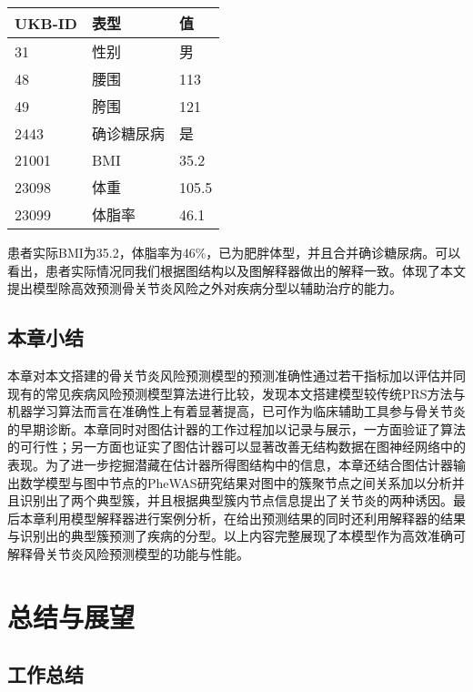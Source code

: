 \documentclass[
]{article}
\begin{document}
\begin{longtable}[]{@{}lll@{}}
\toprule()
UKB-ID & 表型 & 值 \\
\midrule()
\endhead
31 & 性别 & 男 \\
48 & 腰围 & 113 \\
49 & 胯围 & 121 \\
2443 & 确诊糖尿病 & 是 \\
21001 & BMI & 35.2 \\
23098 & 体重 & 105.5 \\
23099 & 体脂率 & 46.1 \\
\bottomrule()
\end{longtable}

患者实际BMI为35.2，体脂率为46\%，已为肥胖体型，并且合并确诊糖尿病。可以看出，患者实际情况同我们根据图结构以及图解释器做出的解释一致。体现了本文提出模型除高效预测骨关节炎风险之外对疾病分型以辅助治疗的能力。

\hypertarget{ux672cux7ae0ux5c0fux7ed3-3}{%
\subsection{本章小结}\label{ux672cux7ae0ux5c0fux7ed3-3}}

本章对本文搭建的骨关节炎风险预测模型的预测准确性通过若干指标加以评估并同现有的常见疾病风险预测模型算法进行比较，发现本文搭建模型较传统PRS方法与机器学习算法而言在准确性上有着显著提高，已可作为临床辅助工具参与骨关节炎的早期诊断。本章同时对图估计器的工作过程加以记录与展示，一方面验证了算法的可行性；另一方面也证实了图估计器可以显著改善无结构数据在图神经网络中的表现。为了进一步挖掘潜藏在估计器所得图结构中的信息，本章还结合图估计器输出数学模型与图中节点的PheWAS研究结果对图中的簇聚节点之间关系加以分析并且识别出了两个典型簇，并且根据典型簇内节点信息提出了关节炎的两种诱因。最后本章利用模型解释器进行案例分析，在给出预测结果的同时还利用解释器的结果与识别出的典型簇预测了疾病的分型。以上内容完整展现了本模型作为高效准确可解释骨关节炎风险预测模型的功能与性能。

\hypertarget{ux603bux7ed3ux4e0eux5c55ux671b}{%
\section{总结与展望}\label{ux603bux7ed3ux4e0eux5c55ux671b}}

\hypertarget{ux5de5ux4f5cux603bux7ed3}{%
\subsection{工作总结}\label{ux5de5ux4f5cux603bux7ed3}}
\end{document}
